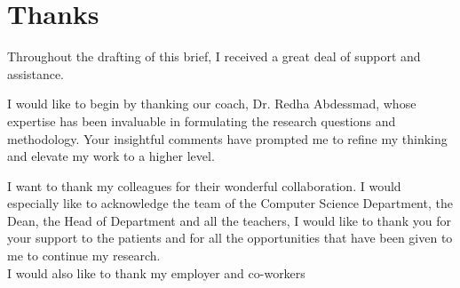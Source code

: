 \chapter*{Thanks}
\thispagestyle{empty}

Throughout the drafting of this brief, I received a great deal of support and assistance.

I would like to begin by thanking our coach, Dr. Redha Abdessmad, whose expertise has been invaluable in formulating the research questions and methodology. Your insightful comments have prompted me to refine my thinking and elevate my work to a higher level.

I want to thank my colleagues for their wonderful collaboration. I would especially like to acknowledge the team of the Computer Science Department, the Dean, the Head of Department and all the teachers, I would like to thank you for your support to the patients and for all the opportunities that have been given to me to continue my research.\\
I would also like to thank my employer and co-workers